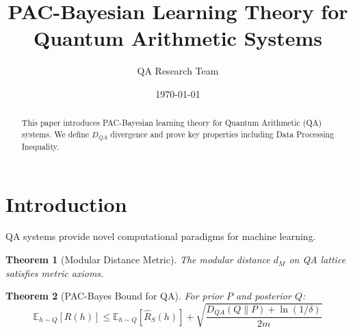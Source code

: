 \documentclass{article}
\title{PAC-Bayesian Learning Theory for Quantum Arithmetic Systems}
\author{QA Research Team}
\date{\today}
\newtheorem{theorem}{Theorem}[section]
\theoremstyle{remark}
\begin{document}
\maketitle

\begin{abstract}
This paper introduces PAC-Bayesian learning theory for Quantum Arithmetic (QA) systems.
We define $D_{QA}$ divergence and prove key properties including Data Processing Inequality.
\end{abstract}

\section{Introduction}
QA systems provide novel computational paradigms for machine learning.

\begin{theorem}[Modular Distance Metric]
The modular distance $d_M$ on QA lattice satisfies metric axioms.
\end{theorem}

\begin{theorem}[PAC-Bayes Bound for QA]
For prior $P$ and posterior $Q$:
\begin{equation}
\mathbb{E}_{h \sim Q} [R(h)] \leq \mathbb{E}_{h \sim Q} [\hat{R}_S(h)] + \sqrt{\frac{D_{QA}(Q \| P) + \ln(1/\delta)}{2m}}
\end{equation}
\end{theorem}

\end{document}
